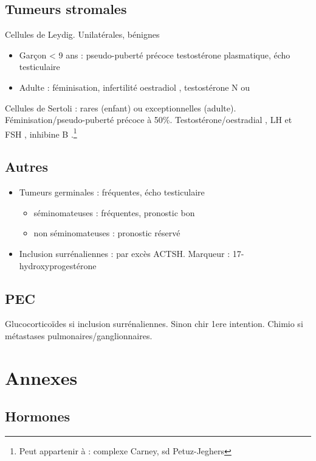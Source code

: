 \documentclass{book}
\begin{document}
\subsection{Tumeurs stromales}
\label{sec:orgd3a53cf}
Cellules de Leydig. Unilatérales, bénignes
\begin{itemize}
\item Garçon < 9 ans : pseudo-puberté précoce \thus testostérone plasmatique, écho
testiculaire
\item Adulte : féminisation, infertilité \thus oestradiol \inc, testostérone N ou \dec
\end{itemize}

Cellules de Sertoli : rares (enfant) ou exceptionnelles
(adulte). Féminisation/pseudo-puberté précoce à 50\%. Testostérone/oestradial
\inc, LH et FSH \dec, inhibine B \inc.\footnote{Peut appartenir à : complexe Carney, sd Petuz-Jeghers}

\subsection{Autres}
\label{sec:orgf72ddbf}
\begin{itemize}
\item Tumeurs germinales : fréquentes, écho testiculaire
\begin{itemize}
\item séminomateuses : fréquentes, pronostic bon
\item non séminomateuses : pronostic réservé
\end{itemize}
\item Inclusion surrénaliennes : par excès ACTSH. Marqueur : 17-hydroxyprogestérone
\end{itemize}

\subsection{PEC}
\label{sec:org54f9b66}
Glucocorticoïdes si inclusion surrénaliennes. Sinon chir 1ere intention. Chimio si métastases pulmonaires/ganglionnaires.


\section{Annexes}
\label{sec:orgc1b7649}
\subsection{Hormones}
\label{sec:org6083314}
\end{document}
